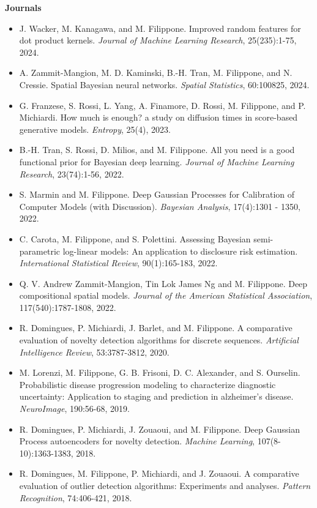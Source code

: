 \textbf{Journals}\begin{itemize}\item  J. Wacker, M. Kanagawa, and M. Filippone. Improved random features for dot product kernels. \emph{Journal of Machine Learning Research}, 25(235):1-75, 2024.  
\item  A. Zammit-Mangion, M. D. Kaminski, B.-H. Tran, M. Filippone, and N. Cressie. Spatial Bayesian neural networks. \emph{Spatial Statistics}, 60:100825, 2024.  
\item  G. Franzese, S. Rossi, L. Yang, A. Finamore, D. Rossi, M. Filippone, and P. Michiardi. How much is enough? a study on diffusion times in score-based generative models. \emph{Entropy}, 25(4), 2023.  
\item  B.-H. Tran, S. Rossi, D. Milios, and M. Filippone. All you need is a good functional prior for Bayesian deep learning. \emph{Journal of Machine Learning Research}, 23(74):1-56, 2022.  
\item  S. Marmin and M. Filippone. Deep Gaussian Processes for Calibration of Computer Models (with Discussion). \emph{Bayesian Analysis}, 17(4):1301 - 1350, 2022.  
\item  C. Carota, M. Filippone, and S. Polettini. Assessing Bayesian semi-parametric log-linear models: An application to disclosure risk estimation. \emph{International Statistical Review}, 90(1):165-183, 2022.  
\item  Q. V. Andrew Zammit-Mangion, Tin Lok James Ng and M. Filippone. Deep compositional spatial models. \emph{Journal of the American Statistical Association}, 117(540):1787-1808, 2022.  
\item  R. Domingues, P. Michiardi, J. Barlet, and M. Filippone. A comparative evaluation of novelty detection algorithms for discrete sequences. \emph{Artificial Intelligence Review}, 53:3787-3812, 2020.  
\item  M. Lorenzi, M. Filippone, G. B. Frisoni, D. C. Alexander, and S. Ourselin. Probabilistic disease progression modeling to characterize diagnostic uncertainty: Application to staging and prediction in alzheimer's disease. \emph{NeuroImage}, 190:56-68, 2019.  
\item  R. Domingues, P. Michiardi, J. Zouaoui, and M. Filippone. Deep Gaussian Process autoencoders for novelty detection. \emph{Machine Learning}, 107(8-10):1363-1383, 2018.  
\item  R. Domingues, M. Filippone, P. Michiardi, and J. Zouaoui. A comparative evaluation of outlier detection algorithms: Experiments and analyses. \emph{Pattern Recognition}, 74:406-421, 2018.  

\end{itemize}
